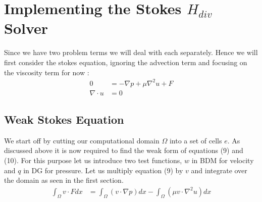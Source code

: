 \documentclass[11pt,twoside,a4paper]{article}
\begin{document}
\section{Implementing the Stokes $H_{div}$ Solver}
Since we have two problem terms we will deal with each separately. Hence we will first consider the stokes equation, ignoring the advection term and focusing on the viscosity term for now :
\begin{align}
0 &= -\nabla p + \mu \nabla^2 u + F  \\
\nabla \cdot u &= 0
\end{align}

\subsection{Weak Stokes Equation}
We start off by cutting our computational domain $\Omega$ into a set of cells $e$. As discussed above it is now required to find the weak form of equations (9) and (10).
For this purpose let us introduce two test functions, $w$ in BDM for velocity and $q$ in DG for pressure.
Let us multiply equation (9) by $v$ and integrate over the domain as seen in the first section.
\begin{align*}
\int_\Omega v \cdot F dx &= \int_\Omega (v \cdot \nabla p) dx - \int_\Omega (\mu v \cdot \nabla^2 u) dx
\end{align*}
\end{document}
